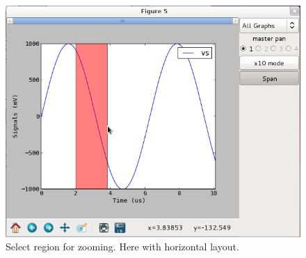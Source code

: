 \documentclass[a4paper,11pt]{article}
\begin{document}
\begin{figure}[htbp]
  \centering
  \includegraphics[scale=.5]{../png/ioscopy-span.png}
  \caption{Select region for zooming. Here with horizontal layout.}
  \label{fig:span}
\end{figure}
\end{document}
